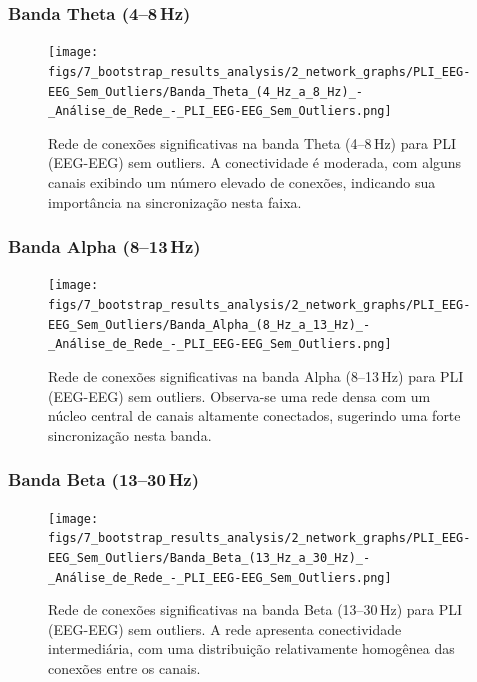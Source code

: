 \subsubsection{\texorpdfstring{Banda Theta (4--8\,Hz)}{Banda Theta (4-8 Hz)}}
\begin{figure}[htb]
  \centering
  \texttt{[image: figs/7\_bootstrap\_results\_analysis/2\_network\_graphs/PLI\_EEG-EEG\_Sem\_Outliers/Banda\_Theta\_(4\_Hz\_a\_8\_Hz)\_-\_Análise\_de\_Rede\_-\_PLI\_EEG-EEG\_Sem\_Outliers.png]}
  \caption{Rede de conexões significativas na banda Theta (4--8\,Hz) para PLI (EEG-EEG) sem outliers. A conectividade é moderada, com alguns canais exibindo um número elevado de conexões, indicando sua importância na sincronização nesta faixa.}
  \label{fig:rede_pli_theta_sem}
\end{figure}

\subsubsection{\texorpdfstring{Banda Alpha (8--13\,Hz)}{Banda Alpha (8-13 Hz)}}
\begin{figure}[htb]
  \centering
  \texttt{[image: figs/7\_bootstrap\_results\_analysis/2\_network\_graphs/PLI\_EEG-EEG\_Sem\_Outliers/Banda\_Alpha\_(8\_Hz\_a\_13\_Hz)\_-\_Análise\_de\_Rede\_-\_PLI\_EEG-EEG\_Sem\_Outliers.png]}
  \caption{Rede de conexões significativas na banda Alpha (8--13\,Hz) para PLI (EEG-EEG) sem outliers. Observa-se uma rede densa com um núcleo central de canais altamente conectados, sugerindo uma forte sincronização nesta banda.}
  \label{fig:rede_pli_alpha_sem}
\end{figure}

\subsubsection{\texorpdfstring{Banda Beta (13--30\,Hz)}{Banda Beta (13-30 Hz)}}
\begin{figure}[htb]
  \centering
  \texttt{[image: figs/7\_bootstrap\_results\_analysis/2\_network\_graphs/PLI\_EEG-EEG\_Sem\_Outliers/Banda\_Beta\_(13\_Hz\_a\_30\_Hz)\_-\_Análise\_de\_Rede\_-\_PLI\_EEG-EEG\_Sem\_Outliers.png]}
  \caption{Rede de conexões significativas na banda Beta (13--30\,Hz) para PLI (EEG-EEG) sem outliers. A rede apresenta conectividade intermediária, com uma distribuição relativamente homogênea das conexões entre os canais.}
  \label{fig:rede_pli_beta_sem}
\end{figure}

